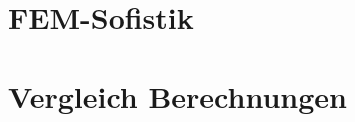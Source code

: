 \documentclass[12 pt,a4 paper ]{scrreprt}
\begin{document}
\clearpage{}





\section{FEM-Sofistik}

\section{Vergleich Berechnungen}
\end{document}
